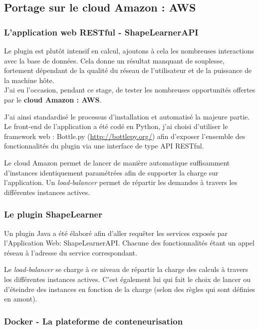 \subsection{Portage sur le cloud Amazon : AWS}

\subsubsection{L'application web RESTful - ShapeLearnerAPI}

Le plugin est plutôt intensif en calcul, ajoutons à cela les nombreuses interactions avec la base de données. Cela donne un résultat manquant de souplesse, fortement dépendant de la qualité du réseau de l'utilisateur et de la puissance de la machine hôte.\\
J'ai eu l'occasion, pendant ce stage, de tester les nombreuses opportunités offertes par le \textbf{cloud Amazon : AWS}.

J'ai ainsi standardisé le processus d'installation et automatisé la majeure partie. Le front-end de l'application a été codé en Python, j'ai choisi d'utiliser le framework web : Bottle.py (\url{http://bottlepy.org/}) afin d'exposer l'ensemble des fonctionnalités du plugin via une interface de type API RESTful.

Le cloud Amazon permet de lancer de manière automatique suffisamment d'instances identiquement paramétrées afin de supporter la charge sur l'application. Un \textit{load-balancer} permet de répartir les demandes à travers les différentes instances actives.

\subsubsection{Le plugin ShapeLearner}

Un plugin Java a été élaboré afin d'aller requêter les services exposés par l'Application Web: ShapeLearnerAPI\-. Chacune des fonctionnalités étant un appel réseau à l'adresse du service correspondant. 

Le \textit{load-balancer} se charge à ce niveau de répartir la charge des calculs à travers les différentes instances actives. C'est également lui qui fait le choix de lancer ou d'éteindre des instances en fonction de la charge (selon des règles qui sont définies en amont).

\clearpage

\subsubsection{Docker - La plateforme de conteneurisation}

